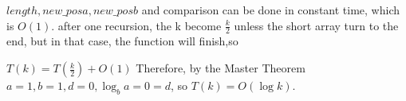 \begin{parts}
\begin{solution}
        $length,new\_posa,new\_posb$ and comparison can be done in constant time, which is $O(1)$. 
        after one recursion, the k become $\frac{k}{2}$ unless the short array turn to the end, but in that case, the function will finish,so
      
        $T(k) = T(\frac{k}{2})+O(1)$
        Therefore, by the Master Theorem $a=1,b=1,d=0,\log_{b}{a}=0=d$, so $T(k) = O(\log k)$.
    \end{solution}
  \end{parts}